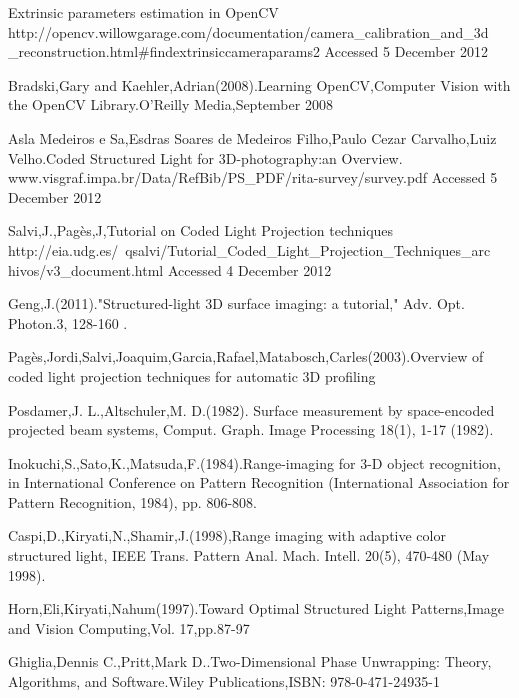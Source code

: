 \begin{singlespace}
\begin{thebibliography}{10000000000}
Extrinsic parameters estimation in OpenCV\newline 
http://opencv.willowgarage.com/documentation/camera\_calibration\_and\_3d\newline
\_reconstruction.html\#findextrinsiccameraparams2 \newline
Accessed 5 December 2012

Bradski,Gary and Kaehler,Adrian(2008).Learning OpenCV,Computer Vision with the OpenCV Library.O'Reilly Media,September 2008 

Asla Medeiros e Sa,Esdras Soares de Medeiros Filho,Paulo Cezar Carvalho,Luiz Velho.Coded Structured Light for 3D-photography:an Overview.\newline
www.visgraf.impa.br/Data/RefBib/PS\_PDF/rita-survey/survey.pdf \newline
Accessed 5 December 2012
  

Salvi,J.,Pag\`es,J,Tutorial on Coded Light Projection techniques\newline 
http://eia.udg.es/~qsalvi/Tutorial\_Coded\_Light\_Projection\_Techniques\_arc\newline
hivos/v3\_document.html \newline
Accessed 4 December 2012

Geng,J.(2011)."Structured-light 3D surface imaging: a tutorial," Adv. Opt. Photon.3, 128-160 .

Pag\`es,Jordi,Salvi,Joaquim,Garcia,Rafael,Matabosch,Carles(2003).Overview of coded light projection techniques for automatic 3D profiling 

Posdamer,J. L.,Altschuler,M. D.(1982). Surface measurement by 
space-encoded projected beam systems, Comput. Graph. Image Processing 
18(1), 1-17 (1982). 

Inokuchi,S.,Sato,K.,Matsuda,F.(1984).Range-imaging for 3-D object recognition, 
in International Conference on Pattern Recognition (International 
Association for Pattern Recognition, 1984), pp. 806-808. 

Caspi,D.,Kiryati,N.,Shamir,J.(1998),Range imaging with adaptive color 
structured light, IEEE Trans. Pattern Anal. Mach. Intell. 20(5), 470-480 
(May 1998). 

Horn,Eli,Kiryati,Nahum(1997).Toward Optimal Structured Light Patterns,Image and Vision Computing,Vol. 17,pp.87-97 

Ghiglia,Dennis C.,Pritt,Mark D..Two-Dimensional Phase Unwrapping: Theory, Algorithms, and Software.Wiley Publications,ISBN: 978-0-471-24935-1


\end{thebibliography}
\end{singlespace}
